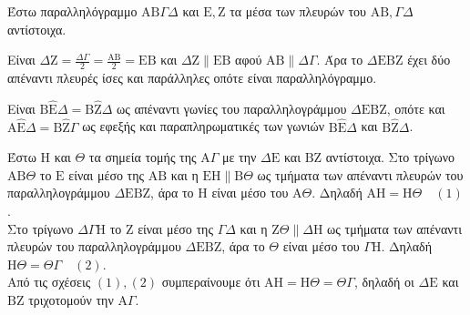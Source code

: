Έστω παραλληλόγραμμο $\mathrm{A}\mathrm{B}\Gamma\Delta$ και $\mathrm{E}, \mathrm{Z}$ τα μέσα των πλευρών του $\mathrm{A}\mathrm{B}, \Gamma\Delta$ αντίστοιχα.

\begin{alist}
    \item Είναι $\Delta\mathrm{Z} = \frac{\Delta\Gamma}{2} = \frac{\mathrm{A}\mathrm{B}}{2} = \mathrm{E}\mathrm{B}$ και $\Delta\mathrm{Z} \parallel \mathrm{E}\mathrm{B}$ αφού $\mathrm{A}\mathrm{B} \parallel \Delta\Gamma$. Άρα το $\Delta\mathrm{E}\mathrm{B}\mathrm{Z}$ έχει δύο απέναντι πλευρές ίσες και παράλληλες οπότε είναι παραλληλόγραμμο.
    
    \item Είναι $\mathrm{B}\hat{\mathrm{E}}\Delta = \mathrm{B}\hat{\mathrm{Z}}\Delta$ ως απέναντι γωνίες του παραλληλογράμμου $\Delta\mathrm{E}\mathrm{B}\mathrm{Z}$, οπότε και $\mathrm{A}\hat{\mathrm{E}}\Delta = \mathrm{B}\hat{\mathrm{Z}}\Gamma$ ως εφεξής και παραπληρωματικές των γωνιών $\mathrm{B}\hat{\mathrm{E}}\Delta$ και $\mathrm{B}\hat{\mathrm{Z}}\Delta$.
    
    \item Έστω $\mathrm{H}$ και $\Theta$ τα σημεία τομής της $\mathrm{A}\Gamma$ με την $\Delta\mathrm{E}$ και $\mathrm{B}\mathrm{Z}$ αντίστοιχα. Στο τρίγωνο $\mathrm{A}\mathrm{B}\Theta$ το $\mathrm{E}$ είναι μέσο της $\mathrm{A}\mathrm{B}$ και η $\mathrm{E}\mathrm{H} \parallel \mathrm{B}\Theta$ ως τμήματα των απέναντι πλευρών του παραλληλογράμμου $\Delta\mathrm{E}\mathrm{B}\mathrm{Z}$, άρα το $\mathrm{H}$ είναι μέσο του $\mathrm{A}\Theta$. Δηλαδή $\mathrm{A}\mathrm{H} = \mathrm{H}\Theta \quad (1)$.\\
    Στο τρίγωνο $\Delta\Gamma\mathrm{H}$ το $\mathrm{Z}$ είναι μέσο της $\Gamma\Delta$ και η $\mathrm{Z}\Theta \parallel \Delta\mathrm{H}$ ως τμήματα των απέναντι πλευρών του παραλληλογράμμου $\Delta\mathrm{E}\mathrm{B}\mathrm{Z}$, άρα το $\Theta$ είναι μέσο του $\Gamma\mathrm{H}$. Δηλαδή $\mathrm{H}\Theta = \Theta\Gamma \quad (2)$.\\
    Από τις σχέσεις $(1), (2)$ συμπεραίνουμε ότι $\mathrm{A}\mathrm{H} = \mathrm{H}\Theta = \Theta\Gamma$, δηλαδή οι $\Delta\mathrm{E}$ και $\mathrm{B}\mathrm{Z}$ τριχοτομούν την $\mathrm{A}\Gamma$.
\end{alist}
